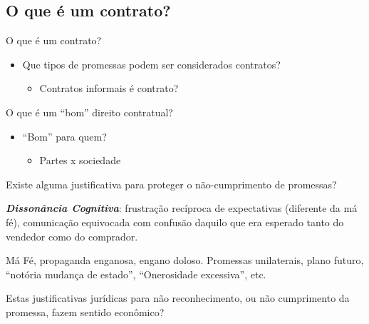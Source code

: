 \documentclass[a4paper,12pt]{article}[abntex2]
\begin{document}
\subsection{\textbf{O que é um contrato?}}

O que é um contrato?\begin{itemize}
    \item Que tipos de promessas podem ser considerados contratos?
    \begin{itemize}
        \item Contratos informais é contrato?
    \end{itemize}
\end{itemize}

O que é um “bom” direito contratual?\begin{itemize}
    \item “Bom” para quem?
    \begin{itemize}
        \item Partes x sociedade
    \end{itemize}
\end{itemize}

Existe alguma justificativa para proteger o não-cumprimento de promessas?

\textbf{\textit{Dissonância Cognitiva}}: frustração recíproca de expectativas (diferente da má fé), comunicação equivocada com confusão daquilo que era esperado tanto do vendedor como do comprador. 

Má Fé, propaganda enganosa, engano doloso. 
Promessas unilaterais, plano futuro, “notória mudança de estado”, “Onerosidade excessiva”, etc.

Estas justificativas jurídicas para não reconhecimento, ou não cumprimento da promessa, fazem sentido econômico?
\end{document}
